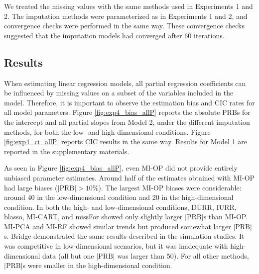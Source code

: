 	We treated the missing values with the same methods used in Experiments 1 and 2.
	The imputation methods were parameterized as in Experiments 1 and 2, and
	convergence checks were performed in the same way.
	These convergence checks suggested that the imputation models had converged after 60 iterations.

\subsection{Results}

	When estimating linear regression models, all partial regression coefficients can be influenced by missing values on a subset of the variables included in the model.
	Therefore, it is important to observe the estimation bias and CIC rates for all model parameters.
	Figure \ref{fig:exp4_bias_allP} reports the absolute PRBs for the intercept and all partial slopes from Model 2, under the different imputation methods, for both the low- and high-dimensional
	conditions.
	Figure \ref{fig:exp4_ci_allP} reports CIC results in the same way.
	Results for Model 1 are reported in the supplementary materials.

\iffalse
	{\color{red}%
	Focusing first on the focal parameter $\beta_1$, most of the MI methods resulted in negligible biases ($|\text{PRB}| < 10\%$) 
	in both conditions.
	The two exceptions were bridge and MI-RF. 
	The former was very competitive in the low-dimensional condition but led to extreme bias and over-coverage in the 
	high-dimensional condition.
	The latter provided the largest focal $|\text{PRB}|$ among the other MI methods, and it was consistently 
	outperformed even by Complete Case analysis.
	Furthermore, they also provided the worst coverage performance for the focal regression coefficient.

	DURR, IURR, and MI-PCA resulted in the lowest bias for the focal parameter in both conditions.
	They also resulted in non-significant deviations from nominal coverage in both the low and high-dimensional conditions.
	While DURR and IURR resulted in slightly smaller PRB than MI-PCA, the latter resulted in the smallest 
	deviations from nominal coverage.
}%
\fi

	As seen in Figure \ref{fig:exp4_bias_allP}, even MI-OP did not provide entirely unbiased parameter estimates.
	Around half of the estimates obtained with MI-OP had large biases ($|\text{PRB}|>10\%$).
	The largest MI-OP biases were considerable: around 40 in the low-dimensional condition and 20 in the 
	high-dimensional condition.
	In both the high- and low-dimensional conditions, DURR, IURR, blasso, MI-CART, and
	missFor showed only slightly larger $|\text{PRB}|$s than MI-OP.
	MI-PCA and MI-RF showed similar trends but produced somewhat larger $|\text{PRB}|$s.
	Bridge demonstrated the same results described in the simulation studies. 
	It was competitive in low-dimensional scenarios, but it was inadequate with high-dimensional 
	data (all but one $|\text{PRB}|$ was larger than 50).
	For all other methods, $|\text{PRB}|$s were smaller in the high-dimensional condition.


